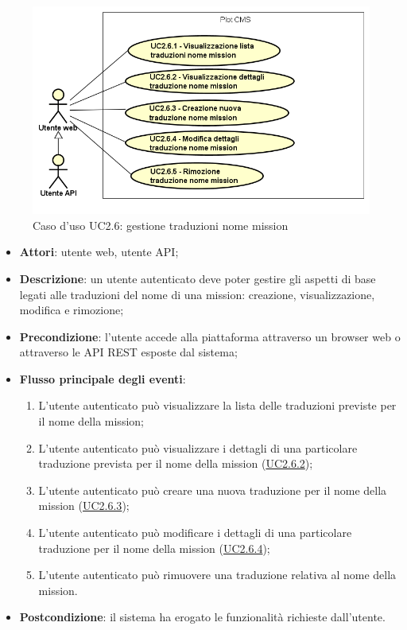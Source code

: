         \begin{figure}
            \centering
            \includegraphics[scale=0.95, width=\textwidth]{immagini/usecase/UC2-6.png}
            \caption{Caso d'uso UC2.6: gestione traduzioni nome mission}\label{fig:UC2.6} 
        \end{figure}
\begin{itemize}
\item \textbf{Attori}: utente web, utente API;
\item \textbf{Descrizione}: un utente autenticato deve poter gestire gli aspetti di base legati alle traduzioni del nome di una mission: creazione, visualizzazione, modifica e rimozione; 
      \item \textbf{Precondizione}: l'utente accede alla piattaforma attraverso un browser web o attraverso le API REST esposte dal sistema;

        \item \textbf{Flusso principale degli eventi}:
          \begin{enumerate}
          \item L'utente autenticato può visualizzare la lista delle traduzioni previste per il nome della mission;
          \item L'utente autenticato può visualizzare i dettagli di una particolare traduzione prevista per il nome della mission (\hyperlink{UC2.6.2}{UC2.6.2});
          \item L'utente autenticato può creare una nuova traduzione per il nome della mission (\hyperlink{UC2.6.3}{UC2.6.3});
          \item L'utente autenticato può modificare i dettagli di una particolare traduzione per il nome della mission (\hyperlink{UC2.6.4}{UC2.6.4});
          \item L'utente autenticato può rimuovere una traduzione relativa al nome della mission.

      \end{enumerate}
    \item \textbf{Postcondizione}: il sistema ha erogato le funzionalità richieste dall'utente.
  \end{itemize}

